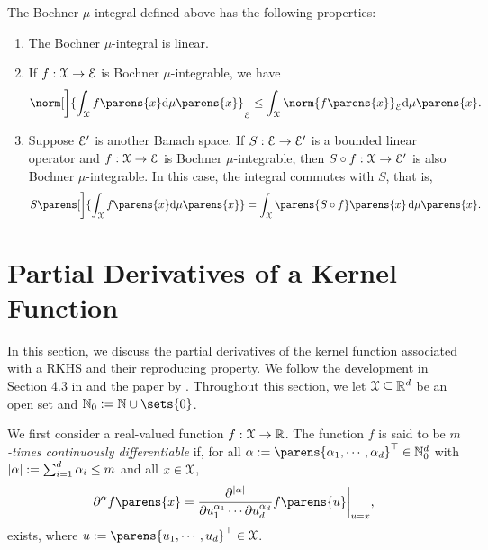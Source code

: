\begin{proposition}\label{prop-properties-bochcher-integral}
	The Bochner $\mu$-integral defined above has the following properties: 
	\begin{enumerate}[label=(\alph*)]
		\item \label{prop-properties-bochcher-integral-a} The Bochner $\mu$-integral is linear. 
		\item \label{prop-properties-bochcher-integral-b} If $f: \mathcal{X} \to \mathcal{E}$ is Bochner $\mu$-integrable, we have 
		\begin{align*}
			\norm[\bigg]{\int_{\calX} f \parens{x} \diff \mu \parens{x}}_{\calE} \le \int_{\calX} \norm{f \parens{x}}_{\calE} \diff \mu \parens{x}. 
		\end{align*}
		\item \label{prop-properties-bochcher-integral-c} Suppose $\mathcal{E}'$ is another Banach space. If $S: \mathcal{E} \to \mathcal{E}'$ is a bounded linear operator and $f: \mathcal{X} \to \mathcal{E}$ is Bochner $\mu$-integrable, then $S \circ f: \mathcal{X} \to \mathcal{E}'$ is also Bochner $\mu$-integrable. In this case, the integral commutes with $S$, that is, 
		\begin{align*}
			S \parens[\bigg]{\int_{\calX} f \parens{x} \diff \mu \parens{x}} = \int_{\calX} \parens{S \circ f} \parens{x} \, \diff \mu \parens{x}. 
		\end{align*}
	\end{enumerate}
\end{proposition}


\section{Partial Derivatives of a Kernel Function}\label{section-kernel-derivative}

In this section, we discuss the partial derivatives of the kernel function associated with a RKHS and their reproducing property. We follow the development in Section 4.3 in \textcite{Steinwart2008-tn} and the paper by \textcite{Zhou2008-jt}. Throughout this section, we let $\mathcal{X} \subseteq \mathbb{R}^d$ be an open set and $\Natural_0 := \Natural \cup \sets{0}$. 

We first consider a real-valued function $f: \mathcal{X} \to \mathbb{R}$. The function $f$ is said to be \textit{$m$-times continuously differentiable} if, for all $\alpha := \parens{\alpha_1, \cdots, \alpha_d}^\top \in \Natural_0^d$ with $\lvert\alpha\rvert := \sum_{i=1}^d \alpha_i \le m$ and all $x \in \mathcal{X}$, 
\begin{align*}
	\partial^\alpha f \parens{x} 
	= \frac{\partial^{\abs{\alpha}}}{\partial u_1^{\alpha_1} \cdots \partial u_d^{\alpha_d}} f \parens{u} \bigg\vert_{u=x}, 
\end{align*}
exists, where $u := \parens{u_1, \cdots, u_d}^\top \in \calX$. 

